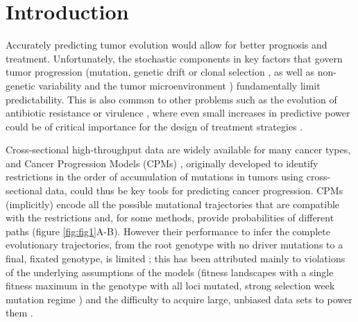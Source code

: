 \documentclass[a4paper,10pt]{article}
\begin{document}







\section{Introduction}\label{sec:intro}



Accurately predicting tumor evolution would allow for better prognosis and
treatment. Unfortunately, the stochastic components in key factors that
govern tumor progression (mutation, genetic drift or clonal selection
\cite{greaves_evolutionary_2015,lipinski_cancer_2016,williams2018}, as
well as non-genetic variability \cite{Brock2009} and the tumor
microenvironment \cite{Albini2007}) fundamentally limit
predictability. This is also common to other problems
\cite{lassig_predicting_2017, losos2018} such as the evolution of
antibiotic resistance \cite{toprak2012} or virulence \cite{Day2004}, where
even small increases in predictive power could be of critical importance
for the design of treatment strategies \cite{palmer2013}.


Cross-sectional high-throughput data are widely available for many cancer
types, and Cancer Progression Models (CPMs) \cite{Beerenwinkel2014,
  beerenwinkel_computational_2016}, originally developed to identify
restrictions in the order of accumulation of mutations in tumors
using cross-sectional data, could thus be key tools for predicting cancer
progression. CPMs (implicitly) encode all the possible mutational
trajectories that are compatible with the restrictions and, for some
methods, provide probabilities of different paths (figure
\ref{fig:fig1}A-B). However their performance to infer the complete
evolutionary trajectories, from the root genotype with no driver mutations
to a final, fixated genotype, is limited
\cite{diaz-uriarte2019a,hosseini2019a}; this has been attributed mainly to
violations of the underlying assumptions of the models (fitness landscapes
with a single fitness maximum in the genotype with all loci mutated,
strong selection week mutation regime \cite{gillespie1983}) and the
difficulty to acquire
large, unbiased data sets to power them \cite{diaz-uriarte2019a}.
\end{document}
